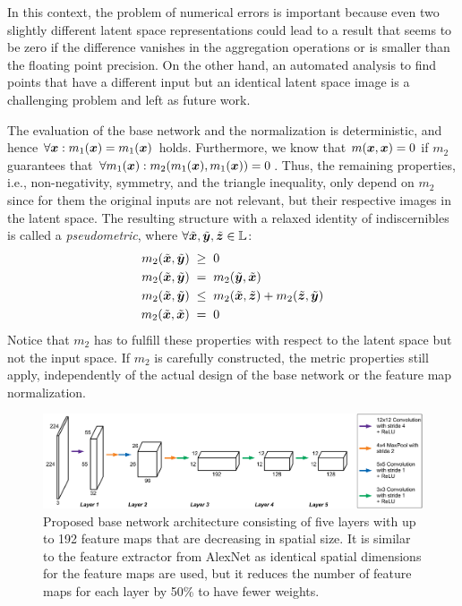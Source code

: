 In this context, the problem of numerical errors is important because even two slightly different latent space representations could lead to a result that seems to be zero if the difference vanishes in the aggregation operations or is smaller than the floating point precision. On the other hand, an automated analysis to find points that have a different input but an identical latent space image is a challenging problem and left as future work.

The evaluation of the base network and the normalization is deterministic, and hence $\forall {\bm{x}} : m_1({\bm{x}}) = m_1({\bm{x}})$ holds. Furthermore, we know that $m({\bm{x}},{\bm{x}}) = 0$ if $m_2$ guarantees that $\forall m_1({\bm{x}}) : m_2( m_1({\bm{x}}), m_1({\bm{x}}) ) = 0$. Thus, the remaining properties, i.e., non-negativity, symmetry, and the triangle inequality, only depend on $m_2$ since for them the original inputs are not relevant, but their respective images in the latent space.
The resulting structure with a relaxed identity of indiscernibles is called a \emph{pseudometric}, where $\forall \tilde{{\bm{x}}},\tilde{{\bm{y}}},\tilde{{\bm{z}}} \in {\mathbb{L}}$:
\begin{align}
    m_2(\tilde{{\bm{x}}},\tilde{{\bm{y}}}) \; &\geq \; 0                \label{eq: relaxed NonNeg}\\
    m_2(\tilde{{\bm{x}}},\tilde{{\bm{y}}}) \; &= \; m_2(\tilde{{\bm{y}}},\tilde{{\bm{x}}})              \label{eq: relaxed Sym}\\
    m_2(\tilde{{\bm{x}}},\tilde{{\bm{y}}}) \; &\leq \; m_2(\tilde{{\bm{x}}},\tilde{{\bm{z}}}) + m_2(\tilde{{\bm{z}}},\tilde{{\bm{y}}}) \label{eq: relaxed TriIneq}\\
    m_2(\tilde{{\bm{x}}},\tilde{{\bm{x}}}) \; &= \; 0                   \label{eq: relaxed IoI}
\end{align}
Notice that $m_2$ has to fulfill these properties with respect to the latent space but not the input space. If $m_2$ is carefully constructed, the metric properties still apply, independently of the actual design of the base network or the feature map normalization.


\begin{figure}[hbp]
    \centering
    \includegraphics[width=1.0\textwidth]{Images/NetworkBase}
    \vspace{-0.5cm}
    \caption{Proposed base network architecture consisting of five layers with up to 192 feature maps that are decreasing in spatial size. It is similar to the feature extractor from AlexNet as identical spatial dimensions for the feature maps are used, but it reduces the number of feature maps for each layer by 50\% to have fewer weights.}
    \label{fig: base network}
\end{figure}


